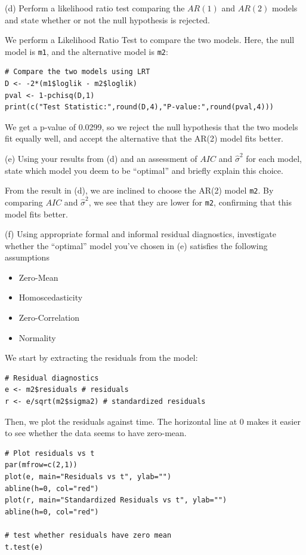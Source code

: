 \documentclass[]{article}
\begin{document}
(d) Perform a likelihood ratio test comparing the $AR(1)$ and $AR(2)$ models and state
whether or not the null hypothesis is rejected.

\color{blue}
We perform a Likelihood Ratio Test to compare the two models. Here, the null model is \texttt{m1}, and the alternative model is \texttt{m2}:

\begin{Verbatim}[frame=single]
# Compare the two models using LRT
D <- -2*(m1$loglik - m2$loglik)
pval <- 1-pchisq(D,1)
print(c("Test Statistic:",round(D,4),"P-value:",round(pval,4)))
\end{Verbatim}

We get a p-value of 0.0299, so we reject the null hypothesis that the two models fit equally well, and accept the alternative that the AR(2) model fits better.
\color{black}

(e) Using your results from (d) and an assessment of $AIC$ and $\hat{\sigma}^2$ for each model, state which model you deem to be “optimal” and briefly explain this choice.

\color{blue}
From the result in (d), we are inclined to choose the AR(2) model \texttt{m2}. By comparing $AIC$ and $\hat{\sigma}^2$, we see that they are lower for \texttt{m2}, confirming that this model fits better.
\color{black}

(f) Using appropriate formal and informal residual diagnostics, investigate whether the “optimal” model you’ve chosen in (e) satisfies the following assumptions
\begin{itemize}
  \item Zero-Mean
  \item Homoscedasticity
  \item Zero-Correlation
  \item Normality
\end{itemize}

\color{blue}
We start by extracting the residuals from the model:

\begin{Verbatim}[frame=single]
# Residual diagnostics
e <- m2$residuals # residuals
r <- e/sqrt(m2$sigma2) # standardized residuals
\end{Verbatim}

Then, we plot the residuals against time. The horizontal line at 0 makes it easier to see whether the data seems to have zero-mean.
\begin{Verbatim}[frame=single]
# Plot residuals vs t
par(mfrow=c(2,1))
plot(e, main="Residuals vs t", ylab="")
abline(h=0, col="red")
plot(r, main="Standardized Residuals vs t", ylab="")
abline(h=0, col="red")

# test whether residuals have zero mean
t.test(e)
\end{Verbatim}
\end{document}
